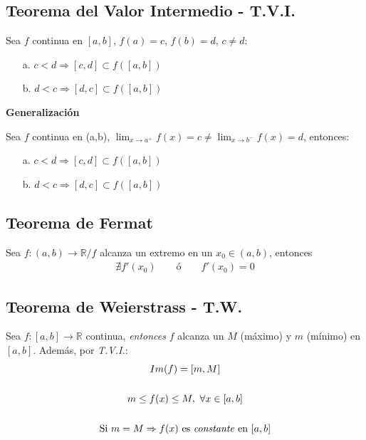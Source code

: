 \documentclass[11pt,titlepage]{article}
\newcommand{\commLim}[2]{\lim_{#1 \to #2}}
\newcommand{\littleTitle}[1]{
	\noindent \ignorespaces
	\small \textbf{#1} \normalsize
	\ignorespaces \ignorespacesafterend
}
\begin{document}
\subsection{Teorema del Valor Intermedio - T.V.I.}
Sea $f$ continua en $[a,b]$, $f(a) = c$, $f(b) = d$, $c \neq d$:
\begin{itemize}
	\item[a.] $c < d \Rightarrow [c,d] \subset f\left([a,b]\right)$
	\item[b.] $d < c \Rightarrow [d,c] \subset f\left([a,b]\right)$
\end{itemize}
\littleTitle{Generalización}\par
Sea $f$ continua en (a,b), $\commLim{x}{a^{+}} f(x) = c \neq \commLim{x}{b^{-}} f(x) = d$, entonces:
\begin{itemize}
	\item[a.] $c < d \Rightarrow [c,d] \subset f\left([a,b]\right)$
	\item[b.] $d < c \Rightarrow [d,c] \subset f\left([a,b]\right)$
\end{itemize}

\subsection{Teorema de Fermat}
Sea $f: (a,b) \to \mathbb{R} / f$ alcanza un extremo en un $x_0 \in (a,b)$, entonces
\begin{gather}
	\nexists f'(x_0) \qquad \text{ó} \qquad f'(x_0) = 0
\end{gather}

\subsection{Teorema de Weierstrass - T.W.}
\begin{commBoxy}
	Sea $f: [a,b] \to \mathbb{R}$ continua, \emph{entonces} $f$ alcanza un $M$ (máximo) y $m$ (mínimo) en $[a,b]$.
	Además, por \emph{T.V.I.}:
	\begin{gather*}
		Im(f) = [m,M] \\ \\
		m \leq f(x) \leq M, \ \forall x \in [a,b] \\ \\
		\text{Si } m = M \Rightarrow f(x) \text{ es \emph{constante} en } [a,b]
	\end{gather*}
\end{commBoxy}
\end{document}

